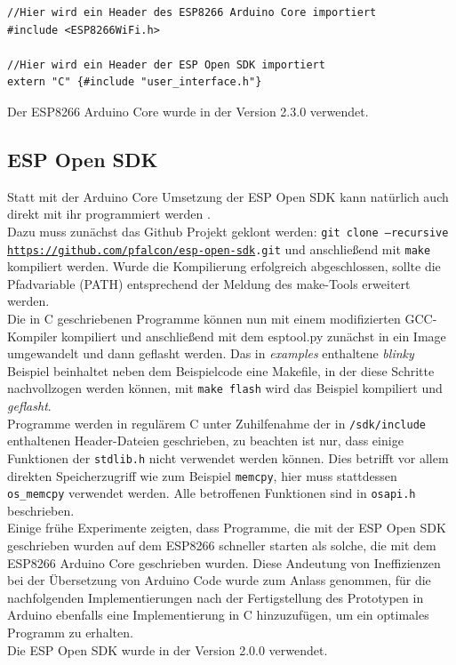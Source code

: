 \begin{verbatim}
//Hier wird ein Header des ESP8266 Arduino Core importiert
#include <ESP8266WiFi.h> 

//Hier wird ein Header der ESP Open SDK importiert
extern "C" {#include "user_interface.h"} 
\end{verbatim}

Der ESP8266 Arduino Core wurde in der Version 2.3.0 verwendet.

\subsection{ESP Open SDK}
Statt mit der Arduino Core Umsetzung der ESP Open SDK kann natürlich auch direkt mit ihr programmiert werden \cite{esp2017open}. \\
Dazu muss zunächst das Github Projekt geklont werden: \texttt{git clone --recursive \url{https://github.com/pfalcon/esp-open-sdk}.git} und anschließend mit \texttt{make} kompiliert werden.
Wurde die Kompilierung erfolgreich abgeschlossen, sollte die Pfadvariable (PATH) entsprechend der Meldung des make-Tools erweitert werden. \\
Die in C geschriebenen Programme können nun mit einem modifizierten GCC-Kompiler kompiliert und anschließend mit dem esptool.py zunächst in ein Image umgewandelt und dann geflasht werden. 
Das in \textit{examples} enthaltene \textit{blinky} Beispiel beinhaltet neben dem Beispielcode eine Makefile, in der diese Schritte nachvollzogen werden können, mit \texttt{make flash} wird das Beispiel kompiliert und \emph{geflasht}. \\
Programme werden in regulärem C unter Zuhilfenahme der in \texttt{/sdk/include} enthaltenen Header-Dateien geschrieben, zu beachten ist nur, dass einige Funktionen der \texttt{stdlib.h} nicht verwendet werden können.
Dies betrifft vor allem direkten Speicherzugriff wie zum Beispiel \texttt{memcpy}, hier muss stattdessen \texttt{os\_memcpy} verwendet werden.
Alle betroffenen Funktionen sind in \texttt{osapi.h} beschrieben. \\
Einige frühe Experimente zeigten, dass Programme, die mit der ESP Open SDK geschrieben wurden auf dem ESP8266 schneller starten als solche, die mit dem ESP8266 Arduino Core geschrieben wurden.
Diese Andeutung von Ineffizienzen bei der Übersetzung von Arduino Code wurde zum Anlass genommen, für die nachfolgenden Implementierungen nach der Fertigstellung des Prototypen in Arduino ebenfalls eine Implementierung in C hinzuzufügen, um ein optimales Programm zu erhalten. \\
Die ESP Open SDK wurde in der Version 2.0.0 verwendet.

